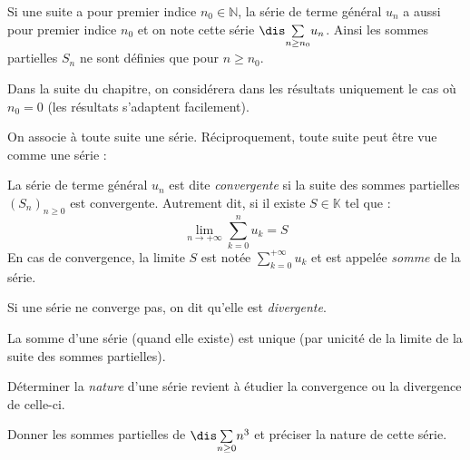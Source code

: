\documentclass[a4paper,10pt]{report}
\newcommand{\Sum}[2]{\ensuremath{\textstyle{\sum\limits_{#1}^{#2}}}}
\begin{document}
\begin{rems}
\item Si une suite a pour premier indice $n_0 \in \mathbb{N}$, la série de terme général $u_n$ a aussi pour premier indice $n_0$ et on note cette série $\dis \Sum{n \geq n_0}{} u_n$. Ainsi les sommes partielles $S_n$ ne sont définies que pour $n \geq n_0$. 

\medskip

\noindent Dans la suite du chapitre, on considérera dans les résultats uniquement le cas où $n_0=0$ (les résultats s'adaptent facilement).
\item On associe à toute suite une série. Réciproquement, toute suite peut être vue comme une série :

%

\vspace{4cm}
\end{rems}

\begin{defin}
La série de terme général $u_n$ est dite \textit{convergente} si la suite des sommes partielles $(S_n)_{n \geq 0}$ est convergente. Autrement dit, si il existe $S \in \mathbb{K}$ tel que :
$$ \lim_{n \rightarrow + \infty} \sum_{k=0}^n u_k = S $$
En cas de convergence, la limite $S$ est notée $\Sum{k=0}{+ \infty} u_k$ et est appelée \textit{somme} de la série.
\end{defin}

\begin{defin} Si une série ne converge pas, on dit qu'elle est \textit{divergente}.
\end{defin}

\begin{rems}
\item La somme d'une série (quand elle existe) est unique (par unicité de la limite de la suite des sommes partielles).
\item Déterminer la \textit{nature} d'une série revient à étudier la convergence ou la divergence de celle-ci.
\end{rems}

\begin{exa} Donner les sommes partielles de $\dis \Sum{n \geq 0}{} n^3$ et préciser la nature de cette série.
\end{exa} 
\end{document}
